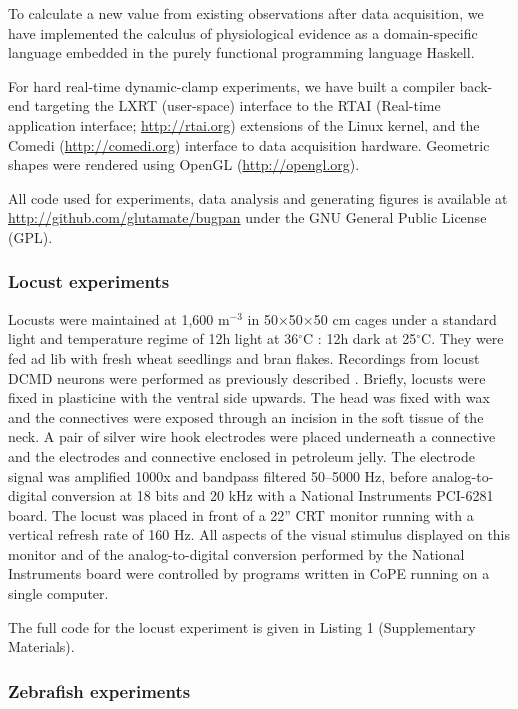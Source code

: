 To calculate a new value from existing observations after data
acquisition, we have implemented the calculus of physiological
evidence as a domain-specific language embedded in the purely functional
programming language Haskell.

For hard real-time dynamic-clamp experiments, we have built a compiler
back-end targeting the LXRT (user-space) interface to the RTAI (Real-time
application interface; \url{http://rtai.org}) extensions of the Linux
kernel, and the Comedi (\url{http://comedi.org}) interface to data
acquisition hardware. Geometric shapes were rendered using OpenGL
(\url{http://opengl.org}).

All code used for experiments, data analysis and generating figures is
available at \url{http://github.com/glutamate/bugpan} under the GNU General
Public License (GPL).

\subsubsection*{Locust experiments}

Locusts were maintained at 1,600 m$^{-3}$ in 50$\times$50$\times$50 cm cages under a
standard light and temperature regime of 12h light at 36$^{\circ}$C : 12h dark
at 25$^{\circ}$C. They were fed ad lib with fresh wheat seedlings and bran
flakes. Recordings from locust DCMD neurons were performed as
previously described \citep{Matheson2004}. Briefly, locusts were fixed
in plasticine with the ventral side upwards. The head was fixed with
wax
and the connectives were exposed through an
incision in the soft tissue of the neck. A pair of silver wire hook
electrodes were placed underneath a connective and the electrodes
and connective enclosed in petroleum jelly. The electrode signal was
amplified 1000x and bandpass filtered 50--5000 Hz, before
analog-to-digital conversion at 18 bits and 20 kHz with a National
Instruments PCI-6281 board. The locust was placed in front of a 22''
CRT monitor running with a vertical refresh rate of 160 Hz. All
aspects of the visual stimulus displayed on this monitor and of
the analog-to-digital conversion performed by the National Instruments
board were controlled by programs written in
CoPE running on a single computer.

The full code for the locust experiment is given in Listing 1
(Supplementary Materials).

\subsubsection*{Zebrafish experiments}


